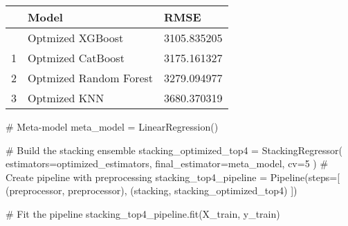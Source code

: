 \documentclass[
  letterpaper,
  DIV=11,
  numbers=noendperiod]{scrreprt}
\newenvironment{Shaded}{\begin{snugshade}}{\end{snugshade}}
\newcommand{\CommentTok}[1]{\textcolor[rgb]{0.37,0.37,0.37}{#1}}
\newcommand{\DecValTok}[1]{\textcolor[rgb]{0.68,0.00,0.00}{#1}}
\newcommand{\NormalTok}[1]{\textcolor[rgb]{0.00,0.23,0.31}{#1}}
\newcommand{\OperatorTok}[1]{\textcolor[rgb]{0.37,0.37,0.37}{#1}}
\newcommand{\StringTok}[1]{\textcolor[rgb]{0.13,0.47,0.30}{#1}}
\begin{document}
\begin{longtable}[]{@{}lll@{}}
\toprule\noalign{}
& Model & RMSE \\
\midrule\noalign{}
\endhead
\bottomrule\noalign{}
\endlastfoot
0 & Optmized XGBoost & 3105.835205 \\
1 & Optmized CatBoost & 3175.161327 \\
2 & Optmized Random Forest & 3279.094977 \\
3 & Optmized KNN & 3680.370319 \\
\end{longtable}

\begin{Shaded}
\begin{Highlighting}[]

\CommentTok{\# Meta{-}model}
\NormalTok{meta\_model }\OperatorTok{=}\NormalTok{ LinearRegression()}

\CommentTok{\# Build the stacking ensemble}
\NormalTok{stacking\_optimized\_top4 }\OperatorTok{=}\NormalTok{ StackingRegressor(}
\NormalTok{    estimators}\OperatorTok{=}\NormalTok{optimized\_estimators,}
\NormalTok{    final\_estimator}\OperatorTok{=}\NormalTok{meta\_model,}
\NormalTok{    cv}\OperatorTok{=}\DecValTok{5}
\NormalTok{)}
\CommentTok{\# Create pipeline with preprocessing}
\NormalTok{stacking\_top4\_pipeline }\OperatorTok{=}\NormalTok{ Pipeline(steps}\OperatorTok{=}\NormalTok{[}
\NormalTok{    (}\StringTok{\textquotesingle{}preprocessor\textquotesingle{}}\NormalTok{, preprocessor),}
\NormalTok{    (}\StringTok{\textquotesingle{}stacking\textquotesingle{}}\NormalTok{, stacking\_optimized\_top4)}
\NormalTok{])}

\CommentTok{\# Fit the pipeline}
\NormalTok{stacking\_top4\_pipeline.fit(X\_train, y\_train)}
\end{Highlighting}
\end{Shaded}
\end{document}
